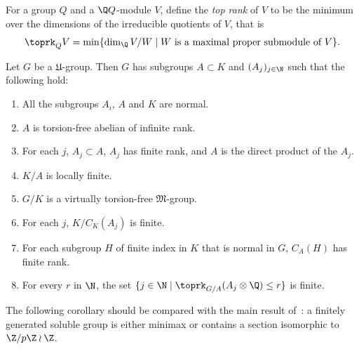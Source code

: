 
For a group $Q$ and a $\Q Q$-module $V$, define the \emph{top rank} of $V$ to be the minimum over the dimensions of the irreducible quotients of $V$, that is
\[
\toprk_Q V = \min \{ \dim_\Q V/W \mid W \text{ is a maximal proper submodule of } V\}.
\]

\setcounter{theor}{1}
\begin{theor}\label{main}
Let $G$ be a $\mathfrak U$-group. Then $G$ has subgroups $A\subset K$ and $(A_j)_{j\in\N}$ such that the following hold:
\begin{enumerate}\romanenumi
\item \label{list3.1.1} All the subgroups $A_i$, $A$ and $K$ are normal.
\item \label{list3.1.2}$A$ is torsion-free abelian of infinite rank.
\item \label{list3.1.3}For each $j$, $A_j\subset A$, $A_j$ has finite rank, and $A$ is the direct product of the $A_j$.
\item \label{list3.1.4}$K/A$ is locally finite.
\item \label{list3.1.5}$G/K$ is a virtually torsion-free $\mathfrak M$-group.
\item \label{list3.1.6}For each $j$, $K/C_K(A_j)$ is finite.
\item \label{list3.1.7}For each subgroup $H$ of finite index in $K$ that is normal in $G$, $C_A(H)$ has finite rank.
\item \label{list3.1.8}For every $r$ in $\N$, the set $\{ j \in \N \mid \toprk_{G/A} (A_j\otimes \Q) \leq r \}$ is finite.
\end{enumerate}
\end{theor}

The following corollary should be compared with the main result of~\cite{K84}: a finitely generated soluble group is either minimax or contains a section isomorphic to $\Z/p\Z\wr \Z$.


